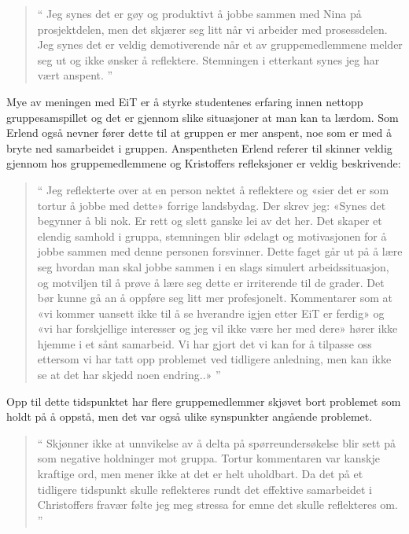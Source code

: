 \begin{quote}``
Jeg synes det er gøy og produktivt å jobbe sammen med Nina på prosjektdelen, men det skjærer seg litt når vi 
arbeider med prosessdelen. Jeg synes det er veldig demotiverende når et av gruppemedlemmene melder seg ut 
og ikke ønsker å reflektere. Stemningen i etterkant synes jeg har vært anspent.
''\end{quote} 

Mye av meningen med EiT er å styrke studentenes erfaring innen nettopp gruppesamspillet og det er gjennom
slike situasjoner at man kan ta lærdom. 
Som Erlend også nevner fører dette til at gruppen er mer anspent, noe som er med å bryte ned samarbeidet i 
gruppen. Anspentheten Erlend referer til skinner veldig gjennom hos gruppemedlemmene og Kristoffers refleksjoner 
er veldig beskrivende:

\begin{quote}``
Jeg reflekterte over at en person nektet å reflektere og «sier det er som tortur å jobbe med dette» forrige 
landsbydag. Der skrev jeg: «Synes det begynner å bli nok. Er rett og slett ganske lei av det her. Det skaper et 
elendig samhold i gruppa, stemningen blir ødelagt og motivasjonen for å jobbe sammen med denne personen 
forsvinner. Dette faget går ut på å lære seg hvordan man skal jobbe sammen i en slags simulert arbeidssituasjon, 
og motviljen til å prøve å lære seg dette er irriterende til de grader. Det bør kunne gå an å oppføre seg litt mer 
profesjonelt. Kommentarer som at «vi kommer uansett ikke til å se hverandre igjen etter EiT er ferdig» og «vi har 
forskjellige interesser og jeg vil ikke være her med dere» hører ikke hjemme i et sånt samarbeid. Vi har gjort det 
vi kan for å tilpasse oss ettersom vi har tatt opp problemet ved tidligere anledning, men kan ikke se at det har 
skjedd noen endring..» 
''\end{quote} 

Opp til dette tidspunktet har flere gruppemedlemmer skjøvet bort problemet som holdt på å oppstå, men det var også 
ulike synspunkter angående problemet.

\begin{quote}``
Skjønner ikke at unnvikelse av å delta på spørreundersøkelse blir sett på som negative holdninger mot gruppa. 
Tortur kommentaren var kanskje kraftige ord, men mener ikke at det er helt uholdbart. Da det på et tidligere tidspunkt skulle
reflekteres rundt det effektive samarbeidet i Christoffers fravær følte jeg meg stressa for emne det skulle reflekteres om.
''\end{quote} 

